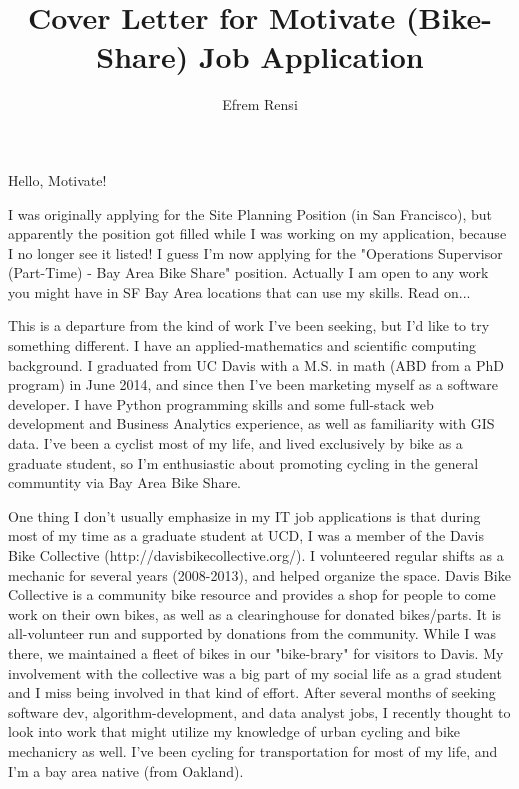 \documentclass{article}
\title{Cover Letter for Motivate (Bike-Share) Job Application}
\date{}
\author{Efrem Rensi}
\begin{document}
\doublespacing
\maketitle
Hello, Motivate!

I was originally applying for the Site Planning Position (in San Francisco), but apparently the position got filled while I was working on my application, because I no longer see it listed!
I guess I'm now applying for the "Operations Supervisor (Part-Time) - Bay Area Bike Share" position.  Actually I am open to any work you might have in SF Bay Area locations that can use my skills. Read on...


This is a departure from the kind of work I've been seeking, but I'd like to try something different.  I have an applied-mathematics and scientific computing background.  I graduated from UC Davis with a M.S. in math (ABD from a PhD program) in June 2014, and since then I've been marketing myself as a software developer.   I have Python programming skills and some full-stack web development and Business Analytics experience, as well as familiarity with GIS data.  I've been a cyclist most of my life, and lived exclusively by bike as a graduate student, so I'm enthusiastic about promoting cycling in the general communtity via Bay Area Bike Share.

One thing I don't usually emphasize in my IT job applications is that during most of my time as a graduate student at UCD, I was a member of the Davis Bike Collective (http://davisbikecollective.org/). I volunteered regular shifts as a mechanic for several years (2008-2013), and helped organize the space.  Davis Bike Collective is a community bike resource and provides a shop for people to come work on their own bikes, as well as a clearinghouse for donated bikes/parts.  It is all-volunteer run and supported by donations from the community.  While I was there, we maintained a fleet of bikes in our "bike-brary" for visitors to Davis.  My involvement with the collective was a big part of my social life as a grad student and I miss being involved in that kind of effort. After several months of seeking software dev, algorithm-development, and data analyst jobs, I recently thought to look into work that might utilize my knowledge of urban cycling and bike mechanicry as well.  I've been cycling for transportation for most of my life, and I'm a bay area native (from Oakland).
\end{document}
